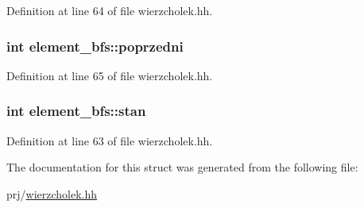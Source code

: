 \-Definition at line 64 of file wierzcholek.\-hh.

\hypertarget{structelement__bfs_a94b882f6922be485d6942f71c29e581d}{
\subsubsection[{poprzedni}]{\setlength{\rightskip}{0pt plus 5cm}int {\bf element\-\_\-bfs\-::poprzedni}}}\label{structelement__bfs_a94b882f6922be485d6942f71c29e581d}


\-Definition at line 65 of file wierzcholek.\-hh.

\hypertarget{structelement__bfs_aa654df64808f513f41d0349571e4b90e}{
\subsubsection[{stan}]{\setlength{\rightskip}{0pt plus 5cm}int {\bf element\-\_\-bfs\-::stan}}}\label{structelement__bfs_aa654df64808f513f41d0349571e4b90e}


\-Definition at line 63 of file wierzcholek.\-hh.



\-The documentation for this struct was generated from the following file\-:\begin{DoxyCompactItemize}
\item 
prj/\hyperlink{wierzcholek_8hh}{wierzcholek.\-hh}\end{DoxyCompactItemize}
